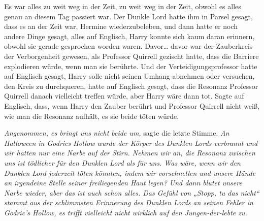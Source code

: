 Es war alles zu weit weg in der Zeit, zu weit weg in der Zeit, obwohl es alles genau an diesem Tag passiert war. Der Dunkle Lord hatte ihm in Parsel gesagt, dass es an der Zeit war, Hermine wiederzubeleben, und dann hatte er noch andere Dinge gesagt, alles auf Englisch, Harry konnte sich kaum daran erinnern, obwohl sie gerade gesprochen worden waren. Davor… davor war der Zauberkreis der Verborgenheit gewesen, als Professor Quirrell gezischt hatte, dass die Barriere explodieren würde, wenn man sie berührte. Und der Verteidigungsprofessor hatte auf Englisch gesagt, Harry solle nicht seinen Umhang abnehmen oder versuchen, den Kreis zu durchqueren, hatte auf Englisch gesagt, dass die Resonanz Professor Quirrell danach vielleicht treffen würde, aber Harry wäre dann tot. Sagte auf Englisch, dass, wenn Harry den Zauber berührt und Professor Quirrell nicht weiß, wie man die Resonanz aufhält, es sie beide töten würde.

\emph{Angenommen, es bringt uns nicht beide um,} sagte die letzte Stimme. \emph{An Halloween in Godrics Hollow wurde der Körper des Dunklen Lords verbrannt und wir hatten nur eine Narbe auf der Stirn. Nehmen wir an, die Resonanz zwischen uns ist tödlicher für den Dunklen Lord als für uns. Was wäre, wenn wir den Dunklen Lord jederzeit töten könnten, indem wir vorschnellen und unsere Hände an irgendeine Stelle seiner freiliegenden Haut legen? Und dann blutet unsere Narbe wieder, aber das ist auch schon alles. Das Gefühl von „Stopp, tu das nicht“ stammt aus der schlimmsten Erinnerung des Dunklen Lords an seinen Fehler in Godric’s Hollow, es trifft vielleicht nicht wirklich auf den Jungen-der-lebte zu.}

